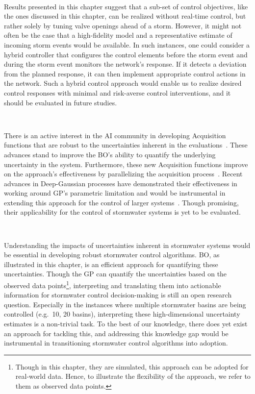 \

Results presented in this chapter suggest that a sub-set of control objectives, like the ones discussed in this chapter, can be realized without real-time control, but rather solely by tuning valve openings ahead of a storm. 
However, it might not often be the case that a high-fidelity model and a representative estimate of incoming storm events would be available. 
In such instances, one could consider a hybrid controller that configures the control elements before the storm event and during the storm event monitors the network's response.
If it detects a deviation from the planned response, it can then implement appropriate control actions in the network.
Such a hybrid control approach would enable us to realize desired control responses with minimal and risk-averse control interventions, and it should be evaluated in future studies.

\


There is an active interest in the AI community in developing Acquisition functions that are robust to the uncertainties inherent in the evaluations~\cite{letham2019}.
These advances stand to improve the BO's ability to quantify the underlying uncertainty in the system. 
Furthermore, these new Acquisition functions improve on the approach's effectiveness by parallelizing the acquisition process~\cite{frazier2018tutorial}. 
Recent advances in Deep-Gaussian processes have demonstrated their effectiveness in working around GP's parametric limitation and would be instrumental in extending this approach for the control of larger systems~\cite{damianou2013deep}.
Though promising, their applicability for the control of stormwater systems is yet to be evaluated. 

\

Understanding the impacts of uncertainties inherent in stormwater systems would be essential in developing robust stormwater control algorithms.
BO, as illustrated in this chapter, is an efficient approach for quantifying these uncertainties. 
Though the GP can quantify the uncertainties based on the observed data points\footnote{Though in this chapter, they are simulated, this approach can be adopted for real-world data. Hence, to illustrate the flexibility of the approach, we refer to them as observed data points.}, interpreting and translating them into actionable information for stormwater control decision-making is still an open research question.
Especially in the instances where multiple stormwater basins are being controlled (e.g.\ 10, 20 basins), interpreting these high-dimensional uncertainty estimates is a non-trivial task.
To the best of our knowledge, there does yet exist an approach for tackling this, and addressing this knowledge gap would be instrumental in transitioning stormwater control algorithms into adoption. 

